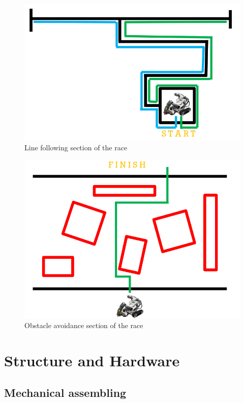 \documentclass[a4paper,11pt,oneside]{book}
\begin{document}
	\begin{figure}
		\centering
		\includegraphics[scale=0.55]{figs/lineFollowingArena}
		\caption{Line following section of the race}\label{fig:lineFollowingArena.png}
	\end{figure}
	
	\begin{figure}
		\centering
		\includegraphics[scale=0.55]{figs/obstacleArena}
		\caption{Obstacle avoidance section of the race}\label{fig:obstacleArena.png}
	\end{figure}
	
	
		\section{Structure and Hardware}
		\subsection {Mechanical assembling}
		
\end{document}
